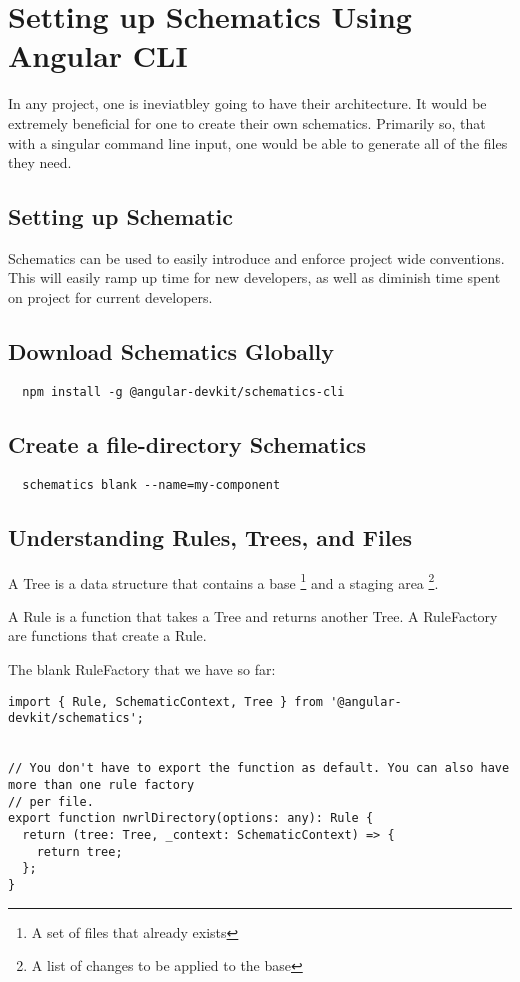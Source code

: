 \maketitle{}
\section{ Setting up Schematics Using Angular CLI }

In any project, one is ineviatbley going to have their architecture. It would
be extremely beneficial for one to create their own schematics. Primarily so,
that with a singular command line input, one would be able to generate all of
the files they need.

\subsection{ Setting up Schematic }

Schematics can be used to easily introduce and enforce project wide conventions.
This will easily ramp up time for new developers, as well as diminish time
spent on project for current developers.

\subsection{ Download Schematics Globally }
\begin{lstlisting}
  npm install -g @angular-devkit/schematics-cli
\end{lstlisting}

\subsection{ Create a file-directory Schematics }
\begin{lstlisting}
  schematics blank --name=my-component
\end{lstlisting}

\subsection{ Understanding Rules, Trees, and Files }
A Tree is a data structure that contains a base \footnote{A set of files that already exists}
and a staging area \footnote{A list of changes to be applied to the base}.

A Rule is a function that takes a Tree and returns another Tree. A RuleFactory
are functions that create a Rule.

The blank RuleFactory that we have so far:

\begin{lstlisting}
import { Rule, SchematicContext, Tree } from '@angular-devkit/schematics';


// You don't have to export the function as default. You can also have more than one rule factory
// per file.
export function nwrlDirectory(options: any): Rule {
  return (tree: Tree, _context: SchematicContext) => {
    return tree;
  };
}  
\end{lstlisting}

